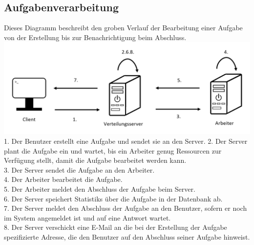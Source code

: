 \documentclass[a4paper,12pt]{article}
\begin{document}
\begin{minipage}[t]{\linewidth}

\subsection{Aufgabenverarbeitung}
Dieses Diagramm beschreibt den groben Verlauf der Bearbeitung einer \gls{Aufgabe} von der Erstellung bis zur Benachrichtigung beim Abschluss.\\
\includegraphics[width=\linewidth]{Systemmodelle/Models/Scheduling.PNG}
\\
1. Der \gls{Benutzer} erstellt eine \gls{Aufgabe} und sendet sie an den \gls{Server}.
2. Der \gls{Server} plant die \gls{Aufgabe} ein und wartet, bis ein \gls{Arbeiter} genug Ressourcen zur Verfügung stellt, damit die \gls{Aufgabe} bearbeitet werden kann.\\
3. Der \gls{Server} sendet die \gls{Aufgabe} an den \gls{Arbeiter}.\\
4. Der \gls{Arbeiter} bearbeitet die \gls{Aufgabe}.\\
5. Der \gls{Arbeiter} meldet den Abschluss der \gls{Aufgabe} beim \gls{Server}.\\
6. Der \gls{Server} speichert \glspl{Statistik} über die \gls{Aufgabe} in der \gls{Datenbank} ab.\\
7. Der \gls{Server} meldet den Abschluss der \gls{Aufgabe} an den \gls{Benutzer}, sofern er noch im System angemeldet ist und auf eine Antwort wartet.\\
8. Der \gls{Server} verschickt eine E-Mail an die bei der Erstellung der \gls{Aufgabe} spezifizierte Adresse, die den \gls{Benutzer} auf den Abschluss seiner \gls{Aufgabe} hinweist.

\end{minipage}
\end{document}
